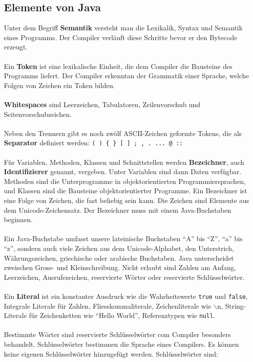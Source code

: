 \subsection{Elemente von Java}
Unter dem Begriff \textbf{Semantik} versteht man die Lexikalik, Syntax und Semantik eines Programms. Der Compiler verläuft diese Schritte bevor er den Bytecode erzeugt.
\\\\
Ein \textbf{Token} ist eine lexikalische Einheit, die dem Compiler die Bausteine des Programms liefert. Der Compiler erkenntan der Grammatik einer Sprache, welche Folgen von Zeichen ein Token bilden.
\\\\
\textbf{Whitespaces} sind Leerzeichen, Tabulatoren, Zeilenvorschub und Seitenvorschubzeichen.
\\\\
Neben den Trennern gibt es noch zwölf ASCII-Zeichen geformte Tokens, die als \textbf{Separator} definiert werden: \texttt{( ) \{ \} [ ] ; , . ... @ ::}
\\\\
Für Variablen, Methoden, Klassen und Schnittstellen werden \textbf{Bezeichner}, auch \textbf{Identifizierer} genannt, vergeben. Unter Variablen sind dann Daten verfügbar. Methoden sind die Unterprogramme in objektorientierten Programmiersprachen, und Klassen sind die Bausteine objektorientierter Programme. Ein Bezeichner ist eine Folge von Zeichen, die fast beliebig sein kann. Die Zeichen sind Elemente aus dem Unicode-Zeichensatz. Der Bezeichner muss mit einem Java-Buchstaben beginnen.
\\\\
Ein Java-Buchstabe umfasst unsere lateinische Buchstaben ``A'' bis ``Z'', ``a'' bis ``z'', sondern auch viele Zeichen aus dem Unicode-Alphabet, den Unterstrich, Währungszeichen, griechische oder arabische Buchstaben. Java unterscheidet zweischen Gross- und Kleinschreibung. Nicht erlaubt sind Zahlen am Anfang, Leerzeichen, Ausrufezeichen, reservierte Wörter oder reservierte Schlüsselwörter.
\\\\
Ein \textbf{Literal} ist ein konstanter Ausdruck wie die Wahrheitswerte \texttt{true} und \texttt{false}, Integrale Literale für Zahlen, Fliesskommaliterale, Zeichenliterale wie $\backslash$n, String-Literale für Zeichenketten wie ``Hello World'', Referenztypen wie \texttt{null}.
\\\\
Bestimmte Wörter sind reservierte Schlüsselwörter com Compiler besonders behandelt. Schlüsselwörter bestimmen die Sprache eines Compilers. Es können keine eigenen Schlüsselwörter hinzugefügt werden. Schlüsselwörter sind:

